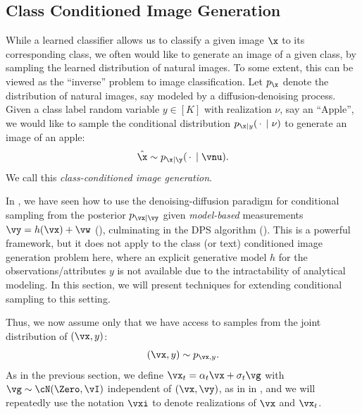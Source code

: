 \documentclass[../../book-main.tex]{subfiles}
\begin{document}
\subsection{Class Conditioned Image Generation}\label{sub:cfg} 
While a learned classifier allows us to classify a given image $\x$ to its
corresponding class, we often would like to generate an image of a given class, by
sampling the learned distribution of natural images. To some extent, this can be
viewed as the ``inverse'' problem to image classification. Let $p_{\x}$ denote
the distribution of natural images, say modeled by a diffusion-denoising
process. Given a class label random variable $y \in [K]$ with realization $\nu$, say
an ``Apple'', we would like to sample the conditional distribution $p_{\x \mid
y}(\,\cdot\, \mid \nu)$ to generate an image of an apple:
\begin{equation}
  \hat{\x} \sim p_{\x\mid \y}(\,\cdot\, \mid \vnu).
\end{equation}
We call this {\em class-conditioned image generation}.

In , we have seen how to use the denoising-diffusion paradigm for
conditional sampling from the posterior $p_{\vx \mid \vy}$ given
\textit{model-based} measurements $\vy = h(\vx) + \vw$
(), culminating in the
DPS algorithm (). This is a powerful
framework, but it does not apply to the class (or text) conditioned image
generation problem here, where an explicit generative model $h$ for the
observations/attributes $y$ is not available due to the
intractability of analytical modeling. In this section, we will present techniques for extending
conditional sampling to this setting.


Thus, we now assume only that we have access to samples from the joint
distribution of $(\vx, y)$:
\begin{equation}
  (\vx, y) \sim p_{\vx, y}.
\end{equation}
As in the previous section, we define $\vx_t = \alpha_t \vx + \sigma_t \vg$
with $\vg \sim \cN(\Zero, \vI)$ independent of $(\vx, \vy)$, as in
 in ,
and we will repeatedly use the notation $\vxi$ to denote realizations of $\vx$
and $\vx_t$.
\end{document}
